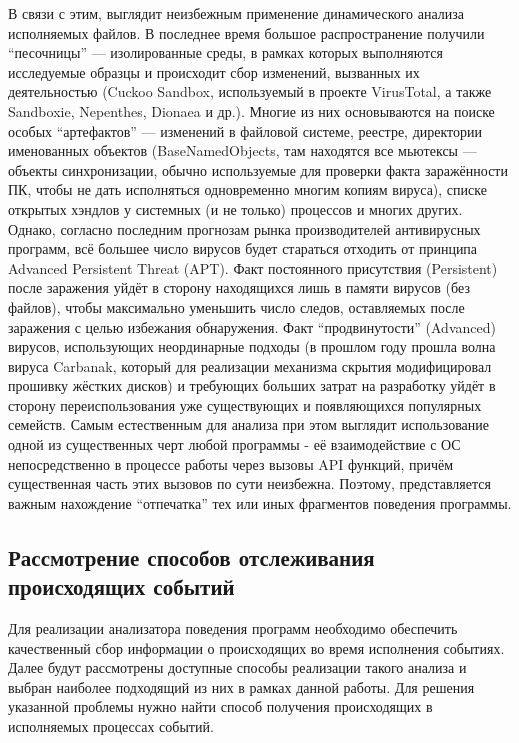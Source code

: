 В связи с этим, выглядит неизбежным применение динамического анализа исполняемых файлов. В последнее время большое распространение получили ``песочницы'' --- изолированные среды, в рамках которых выполняются исследуемые образцы и происходит сбор изменений, вызванных их деятельностью (Cuckoo Sandbox, используемый в проекте VirusTotal, а также Sandboxie, Nepenthes, Dionaea и др.). Многие из них основываются на поиске особых ``артефактов'' --- изменений в файловой системе, реестре, директории именованных объектов (BaseNamedObjects, там находятся все мьютексы --- объекты синхронизации, обычно используемые для проверки факта заражённости ПК, чтобы не дать исполняться одновременно многим копиям вируса), списке открытых хэндлов у системных (и не только) процессов и многих других. Однако, согласно последним прогнозам рынка производителей антивирусных программ\cite{KASPERKSYBULLETIN}, всё большее число вирусов будет стараться отходить от принципа Advanced Persistent Threat (APT). Факт постоянного присутствия (Persistent) после заражения уйдёт в сторону находящихся лишь в памяти вирусов (без файлов), чтобы максимально уменьшить число следов, оставляемых после заражения с целью избежания обнаружения. Факт ``продвинутости'' (Advanced) вирусов, использующих неординарные подходы (в прошлом году прошла волна вируса Carbanak\cite{CARBANAK}, который для реализации механизма скрытия модифицировал прошивку жёстких дисков) и требующих больших затрат на разработку уйдёт в сторону переиспользования уже существующих и появляющихся популярных семейств. Самым естественным для анализа при этом выглядит использование одной из существенных черт любой программы - её взаимодействие с ОС непосредственно в процессе работы через вызовы API функций, причём существенная часть этих вызовов по сути неизбежна. Поэтому, представляется важным нахождение ``отпечатка'' тех или иных фрагментов поведения программы.

\subsection {Рассмотрение способов отслеживания происходящих событий}
Для реализации анализатора поведения программ необходимо обеспечить качественный сбор информации о происходящих во время исполнения событиях. Далее будут рассмотрены доступные способы реализации такого анализа и выбран наиболее подходящий из них в рамках данной работы.
Для решения указанной проблемы нужно найти способ получения происходящих в исполняемых процессах событий. 

